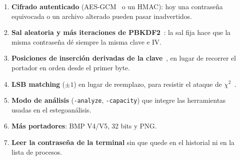 
\begin{enumerate}
\item \textbf{Cifrado autenticado} (AES-GCM~\cite{nist80038d} o un HMAC): hoy una contraseña equivocada o un archivo alterado pueden pasar inadvertidos.
\item \textbf{Sal aleatoria y más iteraciones de PBKDF2}~\cite{nist800132}: la sal fija hace que la misma contraseña dé siempre la misma clave e IV.
\item \textbf{Posiciones de inserción derivadas de la clave}~\cite{sharp2001}, en lugar de recorrer el portador en orden desde el primer byte.
\item \textbf{LSB matching} ($\pm1$) en lugar de reemplazo, para resistir el ataque de $\chi^2$~\cite{westfeld2000}.
\item \textbf{Modo de análisis} (\texttt{-analyze}, \texttt{-capacity}) que integre las herramientas usadas en el estegoanálisis.
\item \textbf{Más portadores}: BMP V4/V5, 32 bits y PNG.
\item \textbf{Leer la contraseña de la terminal} sin que quede en el historial ni en la lista de procesos.
\end{enumerate}
